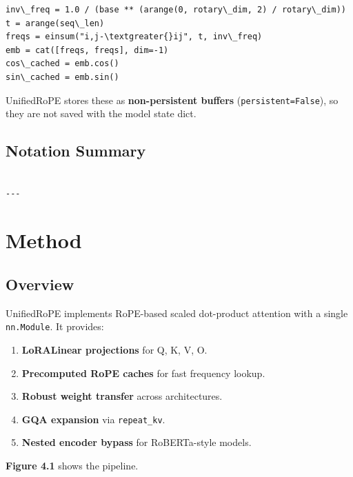 \begin{lstlisting}
inv\_freq = 1.0 / (base ** (arange(0, rotary\_dim, 2) / rotary\_dim))
t = arange(seq\_len)
freqs = einsum("i,j-\textgreater{}ij", t, inv\_freq)
emb = cat([freqs, freqs], dim=-1)
cos\_cached = emb.cos()
sin\_cached = emb.sin()
\end{lstlisting}

UnifiedRoPE stores these as \textbf{non-persistent buffers} (\texttt{persistent=False}), 
so they are not saved with the model state dict.

\subsection{Notation Summary}

\begin{lstlisting}

---
\end{lstlisting}


\section{Method}

\subsection{Overview}

UnifiedRoPE implements RoPE-based scaled dot-product attention with a 
single \texttt{nn.Module}. It provides:

\begin{enumerate}
\item \textbf{LoRALinear projections} for Q, K, V, O.
\item \textbf{Precomputed RoPE caches} for fast frequency lookup.
\item \textbf{Robust weight transfer} across architectures.
\item \textbf{GQA expansion} via \texttt{repeat\_kv}.
\item \textbf{Nested encoder bypass} for RoBERTa-style models.

\end{enumerate}
\textbf{Figure 4.1} shows the pipeline.

